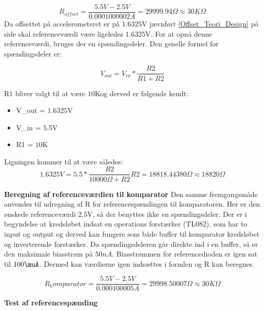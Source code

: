 \begin{equation}
R_{offset}=\frac{5.5V-2.5V}{0.0001000002A}=29999.94\Omega \approx 30K\Omega
\end{equation}  
Da offsettet på accelerometeret er på $1.6325$V jævnført \ref{Offset_Teori_Design} på side \pageref{Offset_Teori_Design} skal referenceværdi være ligeledes $1.6325$V. For at opnå denne referenceværdi, bruges der en spændingsdeler. Den genelle formel for spændingsdeler er: 

\begin{equation} \label{Spaendingsdeler}
V_{out}=V_{in}*\dfrac{R2}{R1+R2}
\end{equation}

R$1$ bliver valgt til at være $10$K\Omega og derved er følgende kendt: 
\begin{itemize}
\item V_{out}  = $1.6325$V
\item V_{in} = $5.5$V
\item R1 = $10$K\Omega
\end{itemize}
Ligningen kommer til at være således: 
\begin{equation}
1.6325V = 5.5* \dfrac{R2}{10000\Omega+R2} 
R2 = 18818.44380\Omega \approx 18820\Omega
\end{equation}

\noindet \textbf{Beregning af referenceværdien til komparator}
Den samme fremgangsmåde anvendes til udregning af R for referencespændingen til komparatoren. Her er den ønskede referenceværdi  $2.5$V, så der benyttes ikke en spændingsdeler. Der er i begyndelse at kredsløbet indsat en operations forstærker (TL$082$), som har to input og output og derved kan fungere som både buffer til komparator kredsløbet og inverterende forstærker. Da spændingsdeleren går direkte ind i en buffer, så er den maksimale biasstrøm på $50nA$. Biasstrømmen for referencedioden er igen sat til $100\muA$. Dermed kan værdierne igen indsættes i formlen og R kan beregnes.

\begin{equation}
R_komparator=\frac{5.5V-2.5V}{0.000100005A}=29998.50007\Omega \approx 30K\Omega 
\end{equation} 

\textbf{Test af referencespænding}

 